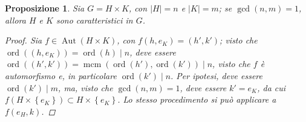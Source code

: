 \documentclass[11pt]{scrartcl}
\theoremstyle{style1}
\newtheorem{prop}{Proposizione}[section]
\numberwithin{equation}{subsection}
\begin{document}
\begin{prop}
	Sia $G = H\times K$, con $\lvert H \rvert = n$ e $\lvert K \rvert = m$; se $\operatorname{gcd}(n,m) =1$, allora $H$ e $K$ sono caratteristici in $G$.
	\begin{proof}
		Sia $f \in \operatorname{Aut} (H \times K)$, con $f(h,e_K) = (h',k')$; visto che $\operatorname{ord}((h,e_K)) = \operatorname{ord}(h)  \mid n$, deve essere $\operatorname{ord}((h',k')) = \operatorname{mcm} (\operatorname{ord}(h') ,\operatorname{ord}(k') )  \mid n$, visto che $f$ \`e automorfismo e, in particolare $\operatorname{ord}(k')  \mid n$.
		Per ipotesi, deve essere $\operatorname{ord}(k')  \mid m $, ma, visto che $\operatorname{gcd}(n,m) =1 $, deve essere $k' = e_K$, da cui $f(H \times \left\{ e_K \right\} ) \subset H \times \left\{ e_K \right\} $.
		Lo stesso procedimento si pu\`o applicare a $f(e_H, k)$.
	\end{proof}
\end{prop}
\end{document}
